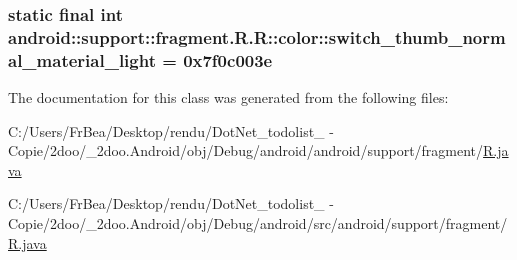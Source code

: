 \hypertarget{classandroid_1_1support_1_1fragment_1_1_r_1_1color_6ae47d04daa7baf6d189108e1580d577}{
\subsubsection[{switch\_\-thumb\_\-normal\_\-material\_\-light}]{\setlength{\rightskip}{0pt plus 5cm}static final int android::support::fragment.R.R::color::switch\_\-thumb\_\-normal\_\-material\_\-light = 0x7f0c003e}}
\label{classandroid_1_1support_1_1fragment_1_1_r_1_1color_6ae47d04daa7baf6d189108e1580d577}




The documentation for this class was generated from the following files:\begin{CompactItemize}
\item 
C:/Users/FrBea/Desktop/rendu/DotNet\_\-todolist\_ - Copie/2doo/\_\-2doo.Android/obj/Debug/android/android/support/fragment/\hyperlink{android_2support_2fragment_2_r_8java}{R.java}\item 
C:/Users/FrBea/Desktop/rendu/DotNet\_\-todolist\_ - Copie/2doo/\_\-2doo.Android/obj/Debug/android/src/android/support/fragment/\hyperlink{src_2android_2support_2fragment_2_r_8java}{R.java}\end{CompactItemize}
